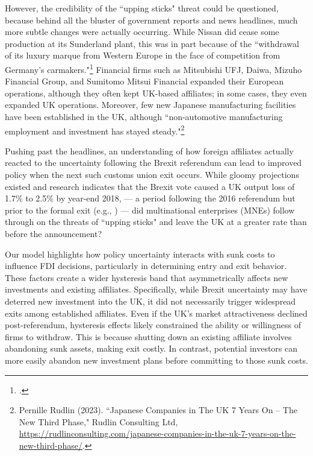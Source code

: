 \documentclass[preprint,11pt,authoryear]{elsarticle}
\begin{document}
However, the credibility of the ``upping sticks" threat could be questioned, because behind all the bluster of government reports and news headlines, much more subtle changes were actually occurring. While Nissan did cease some production at its Sunderland plant, this was in part because of the ``withdrawal of its luxury marque from Western Europe in the face of competition from Germany's carmakers."\footnote{\cite{maidment2019brexit}.} Financial firms such as Mitsubishi UFJ, Daiwa, Mizuho Financial Group, and Sumitomo Mitsui Financial expanded their European operations, although they often kept UK-based affiliates; in some cases, they even expanded UK operations. Moreover, few new Japanese manufacturing facilities have been established in the UK, although ``non-automotive manufacturing employment and investment has stayed steady."\footnote{Pernille Rudlin (2023). ``Japanese Companies in The UK 7 Years On – The New Third Phase," Rudlin Consulting Ltd, \url{https://rudlinconsulting.com/japanese-companies-in-the-uk-7-years-on-the-new-third-phase/}.}

Pushing past the headlines, an understanding of how foreign affiliates actually reacted to the uncertainty following the Brexit referendum can lead to improved policy when the next such customs union exit occurs. While gloomy projections existed and research indicates that the Brexit vote caused a UK output loss of 1.7\% to 2.5\% by year-end 2018, --- a period following the 2016 referendum but prior to the formal exit (e.g., \citealt{born2019}) --- did multinational enterprises (MNEs) follow through on the threats of ``upping sticks" and leave the UK at a greater rate than before the announcement?

Our model highlights how policy uncertainty interacts with sunk costs to influence FDI decisions, particularly in determining entry and exit behavior. These factors create a wider hysteresis band that asymmetrically affects new investments and existing affiliates. Specifically, while Brexit uncertainty may have deterred new investment into the UK, it did not necessarily trigger widespread exits among established affiliates. Even if the UK’s market attractiveness declined post-referendum, hysteresis effects likely constrained the ability or willingness of firms to withdraw. This is because shutting down an existing affiliate involves abandoning sunk assets, making exit costly. In contrast, potential investors can more easily abandon new investment plans before committing to those sunk costs.
\end{document}
